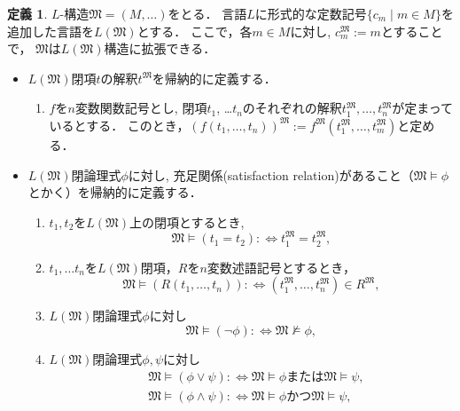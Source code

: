 \documentclass[uplatex, dvipdfmx]{jsarticle}
\numberwithin{equation}{section}
\newcommand{\M}{\mathfrak{M}}
\newcommand{\defiff}{ :\Leftrightarrow}
\theoremstyle{definition}
\newtheorem{definition}{定義}[section]
\begin{document}
\begin{definition}
     $L$-構造$\M = (M,\dots)$をとる．
     言語$L$に形式的な定数記号$\{c_m \mid m \in M\}$を追加した言語を$L(\M)$とする．
     ここで，各$m \in M$に対し, $c_m^{\M}:=m$とすることで，
     $\M$は$L(\M)$構造に拡張できる．
     \begin{itemize}
          \item $L(\M)$閉項$t$の解釈$t^\M$を帰納的に定義する．
          \begin{enumerate}
               \item $f$を$n$変数関数記号とし, 閉項$t_1$, \dots $t_n$のそれぞれの解釈$t_1^\M,\dots,t_n^\M$が定まっているとする．
               このとき，$(f(t_1,\dots,t_n))^\M:=f^\M(t_1^\M,\dots,t_m^\M)$と定める．
          \end{enumerate}
          \item $L(\M)$閉論理式$\phi$に対し, 充足関係(satisfaction relation)があること（$\M \models \phi$とかく）を帰納的に定義する．
          \begin{enumerate}
               \item $t_1,t_2$を$L(\M)$上の閉項とするとき, 
               \begin{equation}
                    \M \models (t_1 = t_2) \defiff t_1^\M = t_2^\M,
               \end{equation}
               \item $t_1,\dots t_n$を$L(\M)$閉項，$R$を$n$変数述語記号とするとき，
               \begin{equation}
                    \M \models (R(t_1, \dots, t_n)) \defiff (t_1^\M, \dots, t_n^\M) \in R^\M,
               \end{equation}
               \item $L(\M)$閉論理式$\phi$に対し
               \begin{equation}
                    \M \models (\lnot \phi) \defiff \M \not\models \phi,
               \end{equation}
               \item $L(\M)$閉論理式$\phi, \psi$に対し
               \begin{align}
                    &\M \models (\phi \lor \psi) \defiff \M \models \phi \text{または} \M \models \psi,\\
                    &\M \models (\phi \land \psi) \defiff \M \models \phi \text{かつ} \M \models \psi,\\

\end{align}
\end{enumerate}
\end{itemize}
\end{definition}
\end{document}

